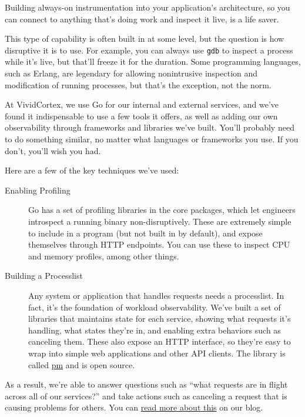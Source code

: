 \documentclass{vivid_layout}
\begin{document}
Building always-on instrumentation into your application's architecture, so you
can connect to anything that's doing work and inspect it live, is a life saver.

This type of capability is often built in at some level, but the question is how
disruptive it is to use. For example, you can always use \texttt{gdb} to inspect
a process while it's live, but that'll freeze it for the duration. Some
programming languages, such as Erlang, are legendary for allowing nonintrusive
inspection and modification of running processes, but that's the exception, not
the norm.

At VividCortex, we use Go for our internal and external services, and we've
found it indispensable to use a few tools it offers, as well as adding our
own observability through frameworks and libraries we've built. You'll probably need to do
something similar, no matter what languages or frameworks you use. If you don't,
you'll wish you had.

Here are a few of the key techniques we've used:

\begin{description}

\item[Enabling Profiling] Go has a set of profiling libraries in the core
packages, which let engineers introspect a running binary non-disruptively.
These are extremely simple to include in a program (but not built in by
default), and expose themselves through HTTP endpoints. You can use these to
inspect CPU and memory profiles, among other things.

\item[Building a Processlist] Any system or application that handles requests needs a processlist. In fact, it's the foundation of workload observability. We've built a set of libraries that maintains
state for each service, showing what requests it's handling, what states they're
in, and enabling extra behaviors such as canceling them. These also expose an
HTTP interface, so they're easy to wrap into simple web applications and other
API clients.  The library is called \href{https://github.com/VividCortex/pm}{pm}
and is open source.

\end{description}

As a result, we're able to answer questions such as ``what requests are in
flight across all of our services?'' and take actions such as canceling a
request that is causing problems for others. You can
\href{https://www.vividcortex.com/blog/2014/11/06/inside-distributed-architecture/}{read more about this}
on our blog.
\end{document}
